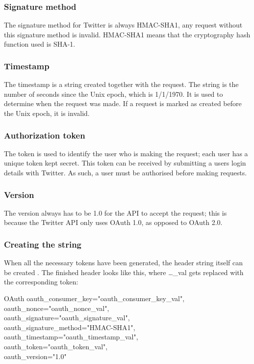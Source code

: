 % 
 
\subsubsection*{Signature method}
The signature method for Twitter is always HMAC-SHA1, any request without this
signature method is invalid. HMAC-SHA1 means that the cryptography hash function
used is \ac{SHA-1}.

\subsubsection*{Timestamp}
The timestamp is a string created together with the request. The string is the
number of seconds since the Unix epoch, which is 1/1/1970. It is used to
determine when the request was made. If a request is marked as created before
the Unix epoch, it is invalid.

\subsubsection*{Authorization token}
The token is used to identify the user who is making the request; each user has
a unique token kept secret. This token can be received by submitting a users
login details with Twitter. As such, a user must be authorised before making
requests.


\subsubsection*{Version}
The version always has to be 1.0 for the API to accept the request; this is
because the Twitter \ac{API} only uses OAuth 1.0, as opposed to OAuth 2.0.

\subsubsection{Creating the string}
When all the necessary tokens have been generated, the header string itself can
be created \citep{TwitterAPIAuth}. The finished header looks like this, where
\ldots\_val gets replaced with the corresponding token:\nl

OAuth oauth\_consumer\_key="oauth\_consumer\_key\_val",\\
oauth\_nonce="oauth\_nonce\_val", \\
oauth\_signature="oauth\_signature\_val", \\
oauth\_signature\_method="HMAC-SHA1", \\
oauth\_timestamp="oauth\_timestamp\_val", \\
oauth\_token="oauth\_token\_val", \\
oauth\_version="1.0" \\